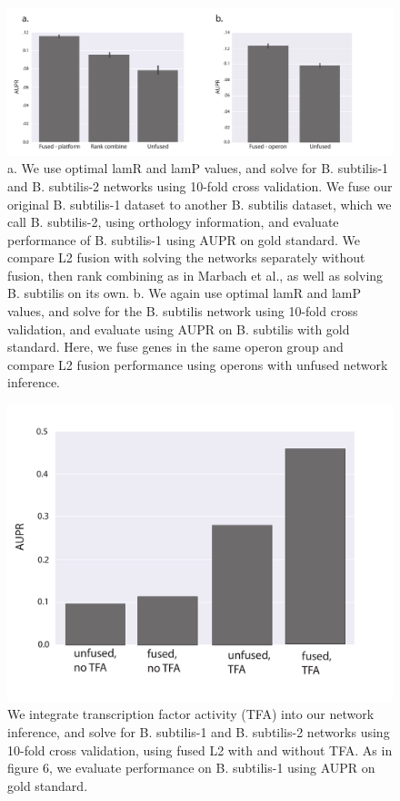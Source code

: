 \documentclass[11pt]{article}
\begin{document}
\begin{figure}
\begin{center}
  \includegraphics[scale=0.45]{fig6.pdf}
  \caption{\label{fusedl2-real} a. We use optimal lamR and lamP values, and solve for B. subtilis-1 and B. subtilis-2 networks using 10-fold cross validation. We fuse our original B. subtilis-1 dataset to another B. subtilis dataset, which we call B. subtilis-2, using orthology information, and evaluate performance of B. subtilis-1 using AUPR on gold standard. We compare L2 fusion with solving the networks separately without fusion, then rank combining as in Marbach et al., as well as solving B. subtilis on its own. b. We again use optimal lamR and lamP values, and solve for the B. subtilis network using 10-fold cross validation, and evaluate using AUPR on B. subtilis with gold standard. 
  Here, we fuse genes in the same operon group and compare L2 fusion performance using operons with unfused network inference.}
\end{center}
\end{figure}

\pagebreak
\begin{figure}
\begin{center}
  \includegraphics[scale=0.45]{fig7.pdf}
  \caption{\label{tfa} We integrate transcription factor activity (TFA) into our network inference, and solve for B. subtilis-1 and B. subtilis-2 networks using 10-fold cross validation, using fused L2 with and without TFA. As in figure 6, we evaluate performance on B. subtilis-1 using AUPR on gold standard.}
\end{center}
\end{figure}
\end{document}
